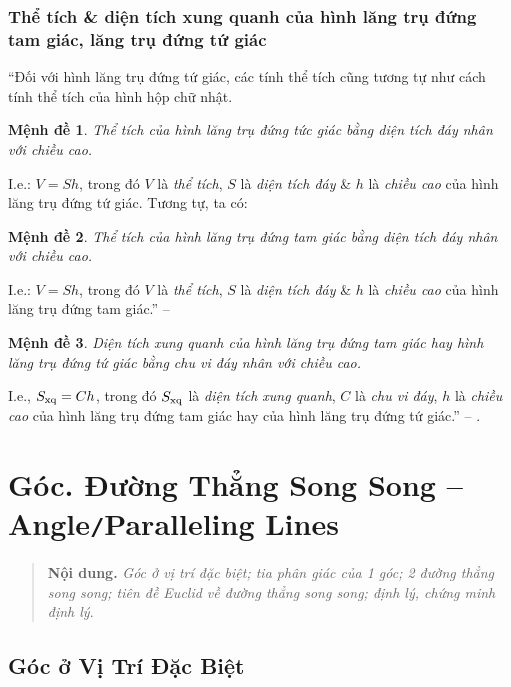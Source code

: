 \documentclass[oneside]{book}
\numberwithin{equation}{section}
\newtheorem{menhde}{Mệnh đề}[section]
\begin{document}
\subsection{Thể tích \& diện tích xung quanh của hình lăng trụ đứng tam giác, lăng trụ đứng tứ giác}
``Đối với hình lăng trụ đứng tứ giác, các tính thể tích cũng tương tự như cách tính thể tích của hình hộp chữ nhật.

\begin{menhde}
	Thể tích của hình lăng trụ đứng tức giác bằng diện tích đáy nhân với chiều cao.
\end{menhde}
I.e.: $V = Sh$, trong đó $V$ là \textit{thể tích}, $S$ là \textit{diện tích đáy} \& $h$ là \textit{chiều cao} của hình lăng trụ đứng tứ giác. Tương tự, ta có:

\begin{menhde}
	Thể tích của hình lăng trụ đứng tam giác bằng diện tích đáy nhân với chiều cao.
\end{menhde}
I.e.: $V = Sh$, trong đó $V$ là \textit{thể tích}, $S$ là \textit{diện tích đáy} \& $h$ là \textit{chiều cao} của hình lăng trụ đứng tam giác.'' -- \cite[p. 84]{SGK_Toan_7_Canh_Dieu_tap_1}

\begin{menhde}
	Diện tích xung quanh của hình lăng trụ đứng tam giác hay hình lăng trụ đứng tứ giác bằng chu vi đáy nhân với chiều cao.
\end{menhde}
I.e., $S_{\rm xq} = Ch$, trong đó $S_{\rm xq}$ là \textit{diện tích xung quanh}, $C$ là \textit{chu vi đáy}, $h$ là \textit{chiều cao} của hình lăng trụ đứng tam giác hay của hình lăng trụ đứng tứ giác.'' -- \cite[p. 85]{SGK_Toan_7_Canh_Dieu_tap_1}.


\chapter{Góc. Đường Thẳng Song Song -- Angle\texttt{/}Paralleling Lines}

\begin{quotation}
	\textbf{Nội dung.} \textit{Góc ở vị trí đặc biệt; tia phân giác của 1 góc; 2 đường thẳng song song; tiên đề Euclid về đường thẳng song song; định lý, chứng minh định lý}.
\end{quotation}

\section{Góc ở Vị Trí Đặc Biệt}
\end{document}
